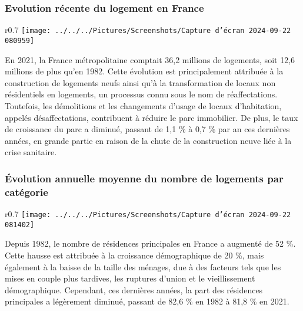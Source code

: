 \documentclass[a4paper, 12pt]{report}
\begin{document}
\subsubsection{Evolution récente du logement en France}

\begin{wrapfigure}{r}{0.7\textwidth}
	\centering
	\texttt{[image: ../../../Pictures/Screenshots/Capture d'écran 2024-09-22 080959]}
\end{wrapfigure}

En 2021, la France métropolitaine comptait 36,2 millions de logements, soit 12,6 millions de plus qu’en 1982. Cette évolution est principalement attribuée à la construction de logements neufs ainsi qu’à la transformation de locaux non résidentiels en logements, un processus connu sous le nom de réaffectations. Toutefois, les démolitions et les changements d’usage de locaux d’habitation, appelés désaffectations, contribuent à réduire le parc immobilier. De plus, le taux de croissance du parc a diminué, passant de 1,1 \% à 0,7 \% par an ces dernières années, en grande partie en raison de la chute de la construction neuve liée à la crise sanitaire.

\subsubsection{Évolution annuelle moyenne du nombre de logements par catégorie}
\newpage
\begin{wrapfigure}{r}{0.7\textwidth}
	\centering
\texttt{[image: ../../../Pictures/Screenshots/Capture d'écran 2024-09-22 081402]}
\end{wrapfigure}

Depuis 1982, le nombre de résidences principales en France a augmenté de 52 \%. Cette hausse est attribuée à la croissance démographique de 20 \%, mais également à la baisse de la taille des ménages, due à des facteurs tels que les mises en couple plus tardives, les ruptures d’union et le vieillissement démographique. Cependant, ces dernières années, la part des résidences principales a légèrement diminué, passant de 82,6 \% en 1982 à 81,8 \% en 2021. 
\end{document}
